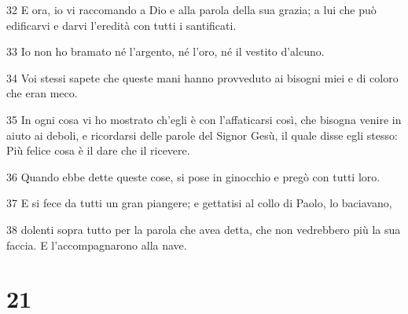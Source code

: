\par 32 E ora, io vi raccomando a Dio e alla parola della sua grazia; a lui che può edificarvi e darvi l'eredità con tutti i santificati.
\par 33 Io non ho bramato né l'argento, né l'oro, né il vestito d'alcuno.
\par 34 Voi stessi sapete che queste mani hanno provveduto ai bisogni miei e di coloro che eran meco.
\par 35 In ogni cosa vi ho mostrato ch'egli è con l'affaticarsi così, che bisogna venire in aiuto ai deboli, e ricordarsi delle parole del Signor Gesù, il quale disse egli stesso: Più felice cosa è il dare che il ricevere.
\par 36 Quando ebbe dette queste cose, si pose in ginocchio e pregò con tutti loro.
\par 37 E si fece da tutti un gran piangere; e gettatisi al collo di Paolo, lo baciavano,
\par 38 dolenti sopra tutto per la parola che avea detta, che non vedrebbero più la sua faccia. E l'accompagnarono alla nave.

\chapter{21}

